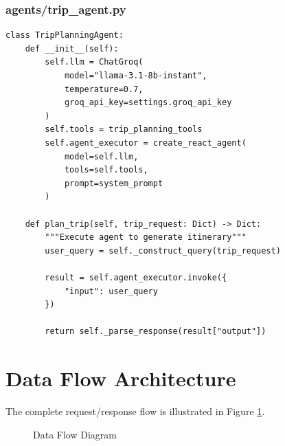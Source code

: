 \documentclass[12pt,a4paper]{report}
\begin{document}
\subsubsection{agents/trip\_agent.py}

\begin{lstlisting}[style=pythonstyle, caption={LangChain Agent Implementation}]
class TripPlanningAgent:
    def __init__(self):
        self.llm = ChatGroq(
            model="llama-3.1-8b-instant",
            temperature=0.7,
            groq_api_key=settings.groq_api_key
        )
        self.tools = trip_planning_tools
        self.agent_executor = create_react_agent(
            model=self.llm,
            tools=self.tools,
            prompt=system_prompt
        )
    
    def plan_trip(self, trip_request: Dict) -> Dict:
        """Execute agent to generate itinerary"""
        user_query = self._construct_query(trip_request)
        
        result = self.agent_executor.invoke({
            "input": user_query
        })
        
        return self._parse_response(result["output"])
\end{lstlisting}

\section{Data Flow Architecture}

The complete request/response flow is illustrated in Figure \ref{fig:data-flow}.

\begin{figure}[H]
    \centering
    \caption{Data Flow Diagram}
    \label{fig:data-flow}
\end{figure}
\end{document}
